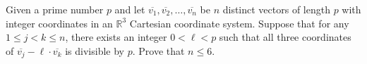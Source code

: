Given a prime number $p$ and let $\overline{v_1},\overline{v_2},\dotsc ,\overline{v_n}$ be $n$ distinct vectors of length $p$ with integer coordinates in an $\mathbb{R}^3$ Cartesian coordinate system. Suppose that for any $1\leqslant j<k\leqslant n$, there exists an integer $0<\ell <p$ such that all three coordinates of $\overline{v_j} -\ell \cdot \overline{v_k} $ is divisible by $p$. Prove that $n\leqslant 6$.